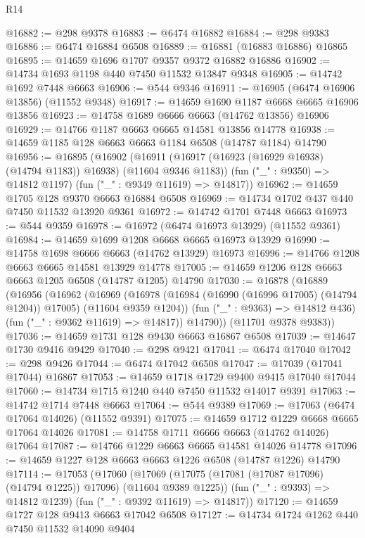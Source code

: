 \begin{lexlean}{R14}
\begin{coremodule}
@16882 := @298 @9378
@16883 := @6474 @16882
@16884 := @298 @9383
@16886 := @6474 @16884 @6508
@16889 := @16881 (@16883 @16886) @16865
@16895 := @14659 @1696 @1707 @9357 @9372 @16882 @16886
@16902 := @14734 @1693 @1198 @440 @7450 @11532 @13847 @9348
@16905 := @14742 @1692 @7448 @6663
@16906 := @544 @9346
@16911 := @16905 (@6474 @16906 @13856) (@11552 @9348)
@16917 := @14659 @1690 @1187 @6668 @6665 @16906 @13856
@16923 := @14758 @1689 @6666 @6663 (@14762 @13856) @16906
@16929 := @14766 @1187 @6663 @6665 @14581 @13856 @14778
@16938 := @14659 @1185 @128 @6663 @6663 @1184 @6508 (@14787 @1184) @14790
@16956 := @16895
    (@16902
      (@16911 (@16917 (@16923 (@16929 @16938) (@14794 @1183)) @16938) (@11604 @9346 @1183))
      (fun ("_" : @9350) => @14812 @1197)
      (fun ("_" : @9349 @11619) => @14817))
@16962 := @14659 @1705 @128 @9370 @6663 @16884 @6508
@16969 := @14734 @1702 @437 @440 @7450 @11532 @13920 @9361
@16972 := @14742 @1701 @7448 @6663
@16973 := @544 @9359
@16978 := @16972 (@6474 @16973 @13929) (@11552 @9361)
@16984 := @14659 @1699 @1208 @6668 @6665 @16973 @13929
@16990 := @14758 @1698 @6666 @6663 (@14762 @13929) @16973
@16996 := @14766 @1208 @6663 @6665 @14581 @13929 @14778
@17005 := @14659 @1206 @128 @6663 @6663 @1205 @6508 (@14787 @1205) @14790
@17030 := @16878
    (@16889
      (@16956
        (@16962
          (@16969
            (@16978 (@16984 (@16990 (@16996 @17005) (@14794 @1204)) @17005) (@11604 @9359 @1204))
            (fun ("_" : @9363) => @14812 @436)
            (fun ("_" : @9362 @11619) => @14817))
          @14790))
      (@11701 @9378 @9383))
@17036 := @14659 @1731 @128 @9430 @6663 @16867 @6508
@17039 := @14647 @1730 @9416 @9429
@17040 := @298 @9421
@17041 := @6474 @17040
@17042 := @298 @9426
@17044 := @6474 @17042 @6508
@17047 := @17039 (@17041 @17044) @16867
@17053 := @14659 @1718 @1729 @9400 @9415 @17040 @17044
@17060 := @14734 @1715 @1240 @440 @7450 @11532 @14017 @9391
@17063 := @14742 @1714 @7448 @6663
@17064 := @544 @9389
@17069 := @17063 (@6474 @17064 @14026) (@11552 @9391)
@17075 := @14659 @1712 @1229 @6668 @6665 @17064 @14026
@17081 := @14758 @1711 @6666 @6663 (@14762 @14026) @17064
@17087 := @14766 @1229 @6663 @6665 @14581 @14026 @14778
@17096 := @14659 @1227 @128 @6663 @6663 @1226 @6508 (@14787 @1226) @14790
@17114 := @17053
    (@17060
      (@17069 (@17075 (@17081 (@17087 @17096) (@14794 @1225)) @17096) (@11604 @9389 @1225))
      (fun ("_" : @9393) => @14812 @1239)
      (fun ("_" : @9392 @11619) => @14817))
@17120 := @14659 @1727 @128 @9413 @6663 @17042 @6508
@17127 := @14734 @1724 @1262 @440 @7450 @11532 @14090 @9404

\end{coremodule}
\end{lexlean}

